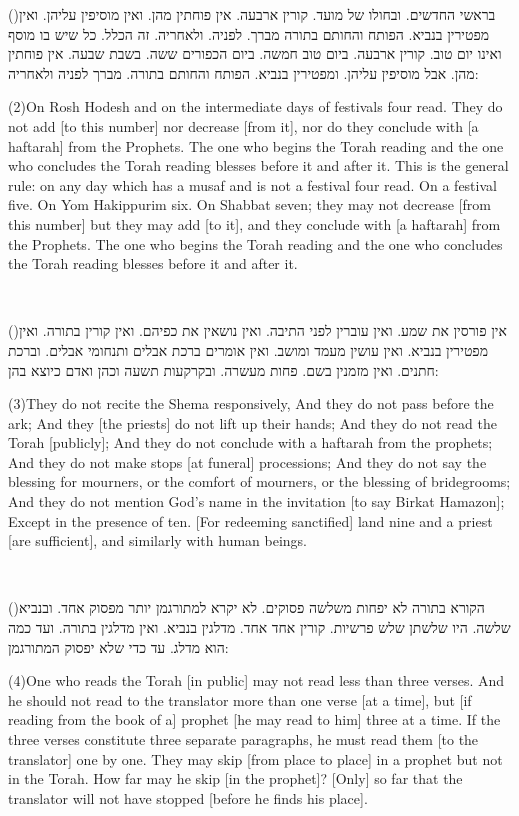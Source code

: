 \documentclass[12pt, openany]{book}
\newcommand{\sethebfont}{
\fontsize{10.5pt}{13.1pt} \selectfont
}
\newcommand{\LTRmark}{‎}
\newcommand{\hebeng}[2]{
	{\sethebfont #1}
	
	{\beginL\englishfont\sethebfont{\raggedright #2 \hfill} \LTRmark\endL}
	
	\vspace{\baselineskip}
}
\newcommand{\vsnum}[1]{(\hebrewnumeral{#1})\space}
\newcommand{\vsnumeng}[1]{(#1)\space}
\begin{document}
\hebeng{\vsnum{2}בראשי החדשים. ובחולו של מועד. קורין ארבעה. אין פוחתין מהן. ואין מוסיפין עליהן. ואין מפטירין בנביא. הפותח והחותם בתורה מברך. לפניה. ולאחריה. זה הכלל. כל שיש בו מוסף ואינו יום טוב. קורין ארבעה. ביום טוב חמשה. ביום הכפורים ששה. בשבת שבעה. אין פוחתין מהן. אבל מוסיפין עליהן. ומפטירין בנביא. הפותח והחותם בתורה. מברך לפניה ולאחריה: }{\vsnumeng{2}On Rosh Hodesh and on the intermediate days of festivals four read. They do not add {[to this number]} nor decrease {[from it]}, nor do they conclude with {[a haftarah]} from the Prophets. The one who begins the Torah reading and the one who concludes the Torah reading blesses before it and after it. This is the general rule: on any day which has a musaf and is not a festival four read. On a festival five. On Yom Hakippurim six. On Shabbat seven; they may not decrease {[from this number]} but they may add {[to it]}, and they conclude with {[a haftarah]} from the Prophets. The one who begins the Torah reading and the one who concludes the Torah reading blesses before it and after it.}%

\hebeng{\vsnum{3}אין פורסין את שמע. ואין עוברין לפני התיבה. ואין נושאין את כפיהם. ואין קורין בתורה. ואין מפטירין בנביא. ואין עושין מעמד ומושב. ואין אומרים ברכת אבלים ותנחומי אבלים. וברכת חתנים. ואין מזמנין בשם. פחות מעשרה. ובקרקעות תשעה וכהן ואדם כיוצא בהן: }{\vsnumeng{3}They do not recite the Shema responsively, And they do not pass before the ark; And they {[the priests]} do not lift up their hands; And they do not read the Torah {[publicly]}; And they do not conclude with a haftarah from the prophets; And they do not make stops {[at funeral]} processions; And they do not say the blessing for mourners, or the comfort of mourners, or the blessing of bridegrooms; And they do not mention God’s name in the invitation {[to say Birkat Hamazon]}; Except in the presence of ten. {[For redeeming sanctified]} land nine and a priest {[are sufficient]}, and similarly with human beings.}%

\hebeng{\vsnum{4}הקורא בתורה לא יפחות משלשה פסוקים. לא יקרא למתורגמן יותר מפסוק אחד. ובנביא שלשה. היו שלשתן שלש פרשיות. קורין אחד אחד. מדלגין בנביא. ואין מדלגין בתורה. ועד כמה הוא מדלג. עד כדי שלא יפסוק המתורגמן: }{\vsnumeng{4}One who reads the Torah {[in public]} may not read less than three verses. And he should not read to the translator more than one verse {[at a time]}, but {[if reading from the book of a]} prophet {[he may read to him]} three at a time. If the three verses constitute three separate paragraphs, he must read them {[to the translator]} one by one. They may skip {[from place to place]} in a prophet but not in the Torah. How far may he skip {[in the prophet]}? {[Only]} so far that the translator will not have stopped {[before he finds his place]}.}%
\end{document}

